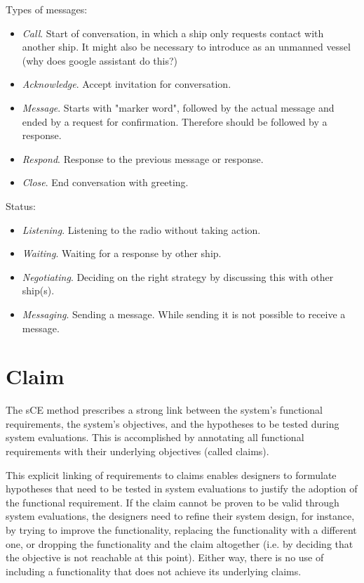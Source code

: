 Types of messages:
\begin{itemize}
	\item \emph{Call}. Start of conversation, in which a ship only requests contact with another ship. It might also be necessary to introduce as an unmanned vessel (why does google assistant do this?)
	\item \emph{Acknowledge}. Accept invitation for conversation.
	\item \emph{Message}. Starts with "marker word", followed by the actual message and ended by a request for confirmation. Therefore should be followed by a response.
	\item \emph{Respond}. Response to the previous message or response.
	\item \emph{Close}. End conversation with greeting.
\end{itemize}

Status:
\begin{itemize}
	\item \emph{Listening}. Listening to the radio without taking action.
	\item \emph{Waiting}. Waiting for a response by other ship.
	\item \emph{Negotiating}. Deciding on the right strategy by discussing this with other ship(s).
	\item \emph{Messaging}. Sending a message. While sending it is not possible to receive a message.
\end{itemize}

\section{Claim}
The sCE method prescribes a strong link between the system’s functional requirements, the system’s objectives, and the hypotheses to be tested during system evaluations. This
is accomplished by annotating all functional requirements with their underlying objectives (called claims).

This explicit linking of requirements to claims enables designers to formulate hypotheses that need to be tested in system evaluations to justify the adoption of the functional requirement. If the claim cannot be proven to be valid through system evaluations, the designers need to refine their system design, for instance, by trying to improve the functionality, replacing the functionality with a different one, or dropping the functionality and the claim altogether (i.e. by deciding that the objective is not reachable at this point). Either way, there is no use of including a functionality that does not achieve its underlying claims.

